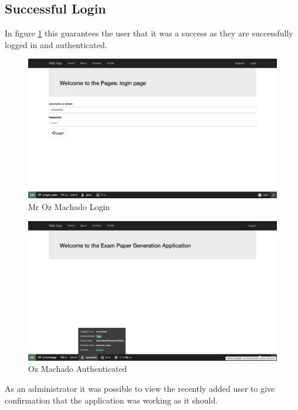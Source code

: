 \subsection{Successful Login}

In figure \ref{fig:Mr Oz Machado Login} this guarantees the user that it was a success as they are successfully logged in and authenticated.

\begin{figure}[htbp]
   \centering
   \includegraphics[width=400pt]{figures/ozmacha5_login.png} %
   \caption{Mr Oz Machado Login}
   \label{fig:Mr Oz Machado Login}
\end{figure}

\begin{figure}[htbp]
   \centering
   \includegraphics[width=400pt]{figures/ozmacha5_success.png} %
   \caption{Oz Machado Authenticated}
   \label{fig:Oz Machado Authenticated}
\end{figure}

As an administrator it was possible to view the recently added user to give confirmation that the application was working as it should.

